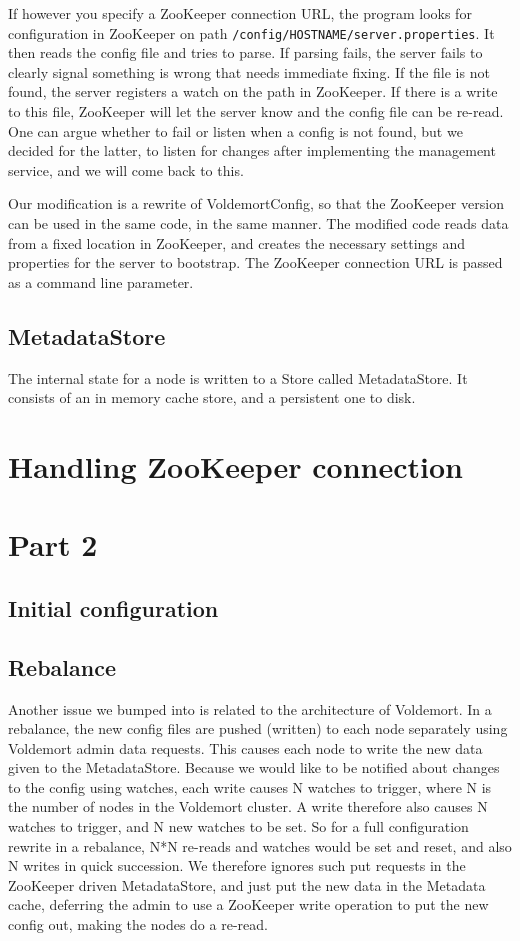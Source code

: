 If however you specify a ZooKeeper connection URL, the program looks for configuration in ZooKeeper on path \texttt{/config/HOSTNAME/server.properties}. It then reads the config file and tries to parse. If parsing fails, the server fails to clearly signal something is wrong that needs immediate fixing. If the file is not found, the server registers a watch on the path in ZooKeeper. If there is a write to this file, ZooKeeper will let the server know and the config file can be re-read. One can argue whether to fail or listen when a config is not found, but we decided for the latter, to listen for changes after implementing the management service, and we will come back to this. 

Our modification is a rewrite of VoldemortConfig, so that the ZooKeeper version can be used in the same code, in the same manner. The modified code reads data from a fixed location in ZooKeeper, and creates the necessary settings and properties for the server to bootstrap. The ZooKeeper connection URL is passed as a command line parameter.

\subsection{MetadataStore}
The internal state for a node is written to a Store called MetadataStore. It consists of an in memory cache store, and a persistent one to disk. 

\section{Handling ZooKeeper connection}


\section{Part 2}

\subsection{Initial configuration}


\subsection{Rebalance}
Another issue we bumped into is related to the architecture of Voldemort.
In a rebalance, the new config files are pushed (written) to each node separately using Voldemort admin data requests. This causes each node to write the new data given to the MetadataStore.
Because we would like to be notified about changes to the config using watches, each write causes N watches to trigger, where N is the number of nodes in the Voldemort cluster.
A write therefore also causes N watches to trigger, and N new watches to be set. So for a full configuration rewrite in a rebalance, N*N re-reads and watches would be set and reset, and also N writes in quick succession.
We therefore ignores such put requests in the ZooKeeper driven MetadataStore, and just put the new data in the Metadata cache, deferring the admin to use a ZooKeeper write operation to put the new config out, making the nodes do a re-read.


